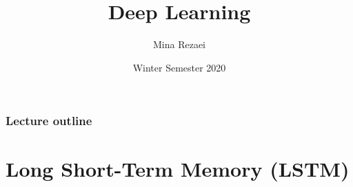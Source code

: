 \documentclass[11pt,compress,t,notes=noshow]{beamer}
\title{Deep Learning}
\author{Mina Rezaei}
\institute{Department of Statistics -- LMU Munich}
\date{Winter Semester 2020}
\newenvironment{vbframe}  %
{
 \begin{frame}[containsverbatim,allowframebreaks]
}
{
\end{frame}
}
\begin{document}



\begin{frame}
\frametitle{Lecture outline}
\tableofcontents
\end{frame}




\section{Long Short-Term Memory (LSTM)}
\end{document}

